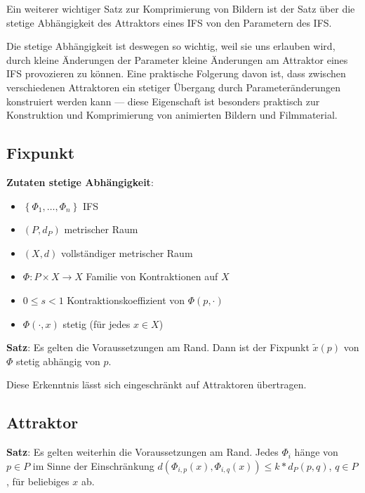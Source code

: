 \documentclass[afourpaper]{latex-classes/handout}
\renewcommand{\emph}[1]{\textcolor{kitGreen}{#1}}
\begin{document}
Ein weiterer wichtiger Satz zur Komprimierung von Bildern ist der Satz über die stetige Abhängigkeit des Attraktors eines IFS von den Parametern des IFS.\@

\begin{marginfigure}
  Die stetige Abhängigkeit ist deswegen so wichtig, weil sie uns erlauben wird, durch kleine Änderungen der Parameter kleine Änderungen am Attraktor eines IFS provozieren zu können. Eine praktische Folgerung davon ist, dass zwischen verschiedenen Attraktoren ein stetiger Übergang durch Parameteränderungen konstruiert werden kann --- diese Eigenschaft ist besonders praktisch zur Konstruktion und Komprimierung von animierten Bildern und Filmmaterial.
\end{marginfigure}

\subsection{Fixpunkt}

\begin{marginfigure}
  \textbf{Zutaten stetige Abhängigkeit}:
  \begin{itemize}
    \item \( \left \{ \Phi_1, \dots, \Phi_n \right \} \) IFS
    \item \( (P, d_P) \) metrischer Raum
    \item \( (X,d) \) vollständiger metrischer Raum
    \item \( \Phi: P \times X \to X \) Familie von Kontraktionen auf \( X \)
    \item \( 0 \leq s < 1 \) Kontraktionskoeffizient von \( \Phi(p, \cdot) \)
    \item \( \Phi(\cdot, x) \) stetig (für jedes \( x \in X \))
  \end{itemize}
\end{marginfigure}

\emph{\textbf{Satz}}: Es gelten die Voraussetzungen am Rand. Dann ist der Fixpunkt \( \widetilde{x}(p) \) von \( \Phi \) stetig abhängig von \( p \).

Diese Erkenntnis lässt sich eingeschränkt auf Attraktoren übertragen.

\subsection{Attraktor}

\emph{\textbf{Satz}}: Es gelten weiterhin die Voraussetzungen am Rand. Jedes \( \Phi_i \) hänge von \( p \in P \) im Sinne der Einschränkung \( d(\Phi_{i,p}(x), \Phi_{i,q}(x)) \leq k * d_P(p,q) \), \( q \in P \), für beliebiges \( x \) ab.
\end{document}
